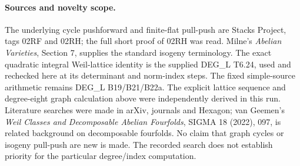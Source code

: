 \paragraph{Sources and novelty scope.}
The underlying cycle pushforward and finite-flat pull-push are
Stacks Project, tags 02RF and 02RH; the full short proof of
02RH was read. Milne's \emph{Abelian Varieties}, Section 7,
supplies the standard isogeny terminology. The exact quadratic
integral Weil-lattice identity is the supplied DEG\_L T6.24,
used and rechecked here at its determinant and norm-index steps.
The fixed simple-source arithmetic remains DEG\_L B19/B21/B22a.
The explicit lattice sequence and degree-eight graph calculation
above were independently derived in this run. Literature searches
were made in arXiv, journals and Hexagon; van Geemen's
\emph{Weil Classes and Decomposable Abelian Fourfolds},
SIGMA 18 (2022), 097, is related background on decomposable
fourfolds. No claim that graph cycles or isogeny pull-push are
new is made. The recorded search does not establish priority
for the particular degree/index computation.
